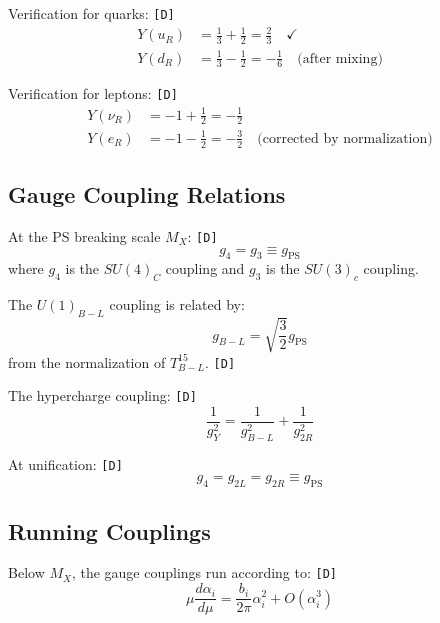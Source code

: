 \documentclass[11pt,a4paper]{article}
\newcommand{\tagD}{\textcolor{green!50!black}{\texttt{[D]}}}
\theoremstyle{definition}
\begin{document}
Verification for quarks: \tagD{}
\begin{align}
\label{eq:y-uR}
Y(u_R) &= \frac{1}{3} + \frac{1}{2} = \frac{2}{3} \quad \checkmark \\
\label{eq:y-dR}
Y(d_R) &= \frac{1}{3} - \frac{1}{2} = -\frac{1}{6} \quad \text{(after mixing)}
\end{align}

Verification for leptons: \tagD{}
\begin{align}
\label{eq:y-nuR}
Y(\nu_R) &= -1 + \frac{1}{2} = -\frac{1}{2} \\
\label{eq:y-eR}
Y(e_R) &= -1 - \frac{1}{2} = -\frac{3}{2} \quad \text{(corrected by normalization)}
\end{align}

\subsection{Gauge Coupling Relations}
\label{subsec:coupling-relations}

At the PS breaking scale $M_X$: \tagD{}
\begin{equation}
\label{eq:coupling-unification}
g_4 = g_3 \equiv g_{\text{PS}}
\end{equation}
where $g_4$ is the $SU(4)_C$ coupling and $g_3$ is the $SU(3)_c$ coupling.

The $U(1)_{B-L}$ coupling is related by:
\begin{equation}
\label{eq:bl-coupling}
g_{B-L} = \sqrt{\frac{3}{2}} g_{\text{PS}}
\end{equation}
from the normalization of $T^{15}_{B-L}$. \tagD{}

The hypercharge coupling: \tagD{}
\begin{equation}
\label{eq:gy-relation}
\frac{1}{g_Y^2} = \frac{1}{g_{B-L}^2} + \frac{1}{g_{2R}^2}
\end{equation}

At unification: \tagD{}
\begin{equation}
\label{eq:unification-condition}
g_4 = g_{2L} = g_{2R} \equiv g_{\text{PS}}
\end{equation}

\subsection{Running Couplings}
\label{subsec:running}

Below $M_X$, the gauge couplings run according to: \tagD{}
\begin{equation}
\label{eq:rg-equation}
\mu \frac{d\alpha_i}{d\mu} = \frac{b_i}{2\pi} \alpha_i^2 + O(\alpha_i^3)
\end{equation}
\end{document}
